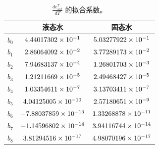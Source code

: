 \begin{table}[]
\centering
\caption{$\frac{d e_{sat}^T}{d T}$ 的拟合系数。}
\label{tab:de_sat_dT的拟合系数}
\begin{tabular}{@{}lcc@{}}
\toprule
     &  液态水  & 固态水                         \\ \midrule
$b_0$ & $\rm 4.44017302 \times 10^{-1}$   & $\rm 5.03277922 \times 10^{-1}$  \\
$b_1$ & $\rm 2.86064092 \times 10^{-2}$  & $\rm 3.77289173 \times 10^{-2}$  \\
$b_2$ & $\rm 7.94683137 \times 10^{-4}$   & $\rm 1.26801703 \times 10^{-3}$  \\
$b_3$ & $\rm 1.21211669 \times 10^{-5}$   & $\rm 2.49468427 \times 10^{-5}$  \\
$b_4$ & $\rm 1.03354611 \times 10^{-7}$   & $\rm 3.13703411 \times 10^{-7}$  \\
$b_5$ & $\rm 4.04125005 \times 10^{-10}$  & $\rm 2.57180651 \times 10^{-9}$  \\
$b_6$ & $\rm -7.88037859 \times 10^{-13}$ & $\rm 1.33268878 \times 10^{-11}$ \\
$b_7$ & $\rm -1.14596802 \times 10^{-14}$ & $\rm 3.94116744 \times 10^{-14}$ \\
$b_8$ & $\rm 3.81294516 \times 10^{-17}$  & $\rm 4.98070196 \times 10^{-17}$ \\\bottomrule
\end{tabular}
\end{table}

